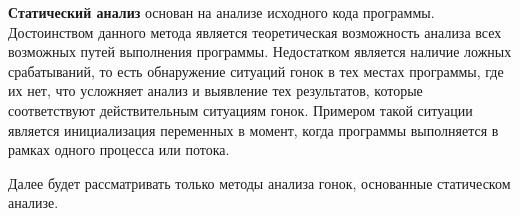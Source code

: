\textbf{Статический анализ} основан на анализе исходного кода программы. Достоинством данного метода является теоретическая возможность анализа всех возможных путей выполнения программы.  Недостатком является наличие ложных срабатываний, то есть обнаружение ситуаций гонок в тех местах программы, где их нет, что усложняет анализ и выявление тех результатов, которые соответствуют действительным ситуациям гонок. Примером такой ситуации является инициализация переменных в момент, когда программы выполняется в рамках одного процесса или потока.

Далее будет рассматривать только методы анализа гонок, основанные статическом анализе.
